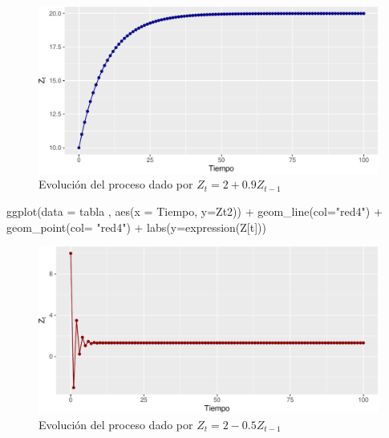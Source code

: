 \documentclass[
  a4paper,
]{article}
\newenvironment{Shaded}{}{}
\newcommand{\AttributeTok}[1]{\textcolor[rgb]{0.84,0.23,0.29}{#1}}
\newcommand{\FunctionTok}[1]{\textcolor[rgb]{0.44,0.26,0.76}{#1}}
\newcommand{\NormalTok}[1]{\textcolor[rgb]{0.14,0.16,0.18}{#1}}
\newcommand{\SpecialCharTok}[1]{\textcolor[rgb]{0.00,0.36,0.77}{#1}}
\newcommand{\StringTok}[1]{\textcolor[rgb]{0.01,0.18,0.38}{#1}}
\begin{document}
\begin{figure}[H]

\caption{Evolución del proceso dado por \(Z_t =2+0.9Z_{t-1}\)}

{\centering \includegraphics{index_files/figure-pdf/fig21-1.pdf}

}

\end{figure}%

\begin{Shaded}
\begin{Highlighting}[]
\FunctionTok{ggplot}\NormalTok{(}\AttributeTok{data =}\NormalTok{ tabla , }\FunctionTok{aes}\NormalTok{(}\AttributeTok{x =}\NormalTok{ Tiempo, }\AttributeTok{y=}\NormalTok{Zt2)) }\SpecialCharTok{+}
  \FunctionTok{geom\_line}\NormalTok{(}\AttributeTok{col=}\StringTok{"red4"}\NormalTok{) }\SpecialCharTok{+}
  \FunctionTok{geom\_point}\NormalTok{(}\AttributeTok{col=} \StringTok{"red4"}\NormalTok{) }\SpecialCharTok{+}
  \FunctionTok{labs}\NormalTok{(}\AttributeTok{y=}\FunctionTok{expression}\NormalTok{(Z[t]))}
\end{Highlighting}
\end{Shaded}

\begin{figure}[H]

\caption{Evolución del proceso dado por \(Z_t =2-0.5Z_{t-1}\)}

{\centering \includegraphics{index_files/figure-pdf/fig22-1.pdf}

}

\end{figure}%
\end{document}
